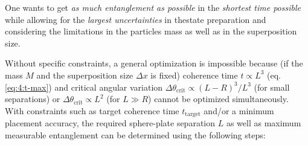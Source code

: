 One wants to get \textit{as much entanglement as possible} in the \textit{shortest time possible} while allowing for the \textit{largest uncertainties} in thestate preparation and considering the limitations in the particles mass as well as in the superposition size.

Without specific constraints, a general optimization is impossible because (if the mass $M$ and the superposition size $\Delta x$ is fixed) coherence time $t \propto L^3$ (eq. \eqref{eq:4:t-max}) and critical angular variation $\Delta \theta_\mathrm{crit} \propto (L-R)^3/L^3$ (for small separations) or $\Delta \theta_\mathrm{crit} \propto L^2$ (for $L \gg R$) cannot be optimized simultaneously.
With constraints such as target coherence time $t_\mathrm{target}$ and/or a minimum placement accuracy, the required sphere-plate separation $L$ as well as maximum measurable entanglement can be determined using the following steps:

